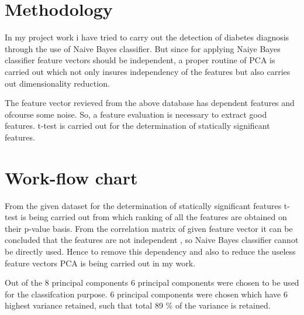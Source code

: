\section{Methodology}
In my project work i have tried to carry out the detection of diabetes diagnosis through the use of Naive Bayes classifier.
But since for applying Naiye Bayes classifier feature vectors should be independent, a proper routine of PCA is carried out which not only insures independency of the features but also carries out dimensionality reduction.

The feature vector revieved from the above database has dependent features and ofcourse some noise. So, a feature evaluation is necessary to extract good features. t-test is carried out for the determination of statically significant features.

\section{Work-flow chart}
\label{S:2}
From the given dataset for the determination of statically significant features t-test is being carried out from which ranking of all the features are obtained on their p-value basis. From the correlation matrix of given feature vector it can be concluded that the features are not independent , so Naive Bayes classifier cannot be directly used. Hence to remove this dependency and also to reduce the useless feature vectors PCA is being carried out in my work.

Out of the 8 principal components 6 principal components were chosen to be used for the classifcation purpose. 6 principal components were chosen which have 6 highest variance retained, such that total 89 \% of the variance is retained. 

